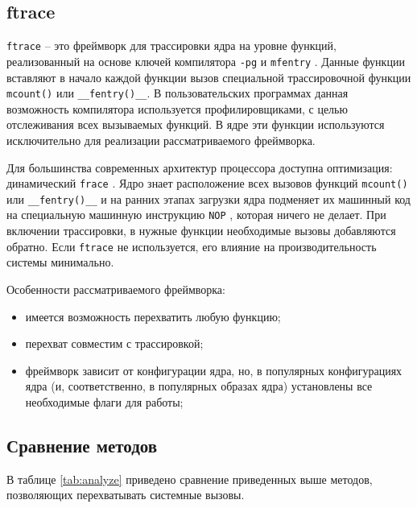 \subsection{ftrace}

\texttt{ftrace} \cite{ftrace} -- это фреймворк для трассировки ядра на уровне функций, реализованный на основе ключей компилятора \texttt{-pg} \cite{ftrace-habr} и \texttt{mfentry} \cite{ftrace-habr}. Данные функции вставляют в начало каждой функции вызов специальной трассировочной функции \texttt{mcount()} или \texttt{\_\_fentry()\_\_}. В пользовательских программах данная возможность компилятора используется профилировщиками, с целью отслеживания всех вызываемых функций. В ядре эти функции используются исключительно для реализации рассматриваемого фреймворка.

Для большинства современных архитектур процессора доступна оптимизация: динамический \texttt{frace} \cite{ftrace-habr}. Ядро знает расположение всех вызовов функций \texttt{mcount()} или \texttt{\_\_fentry()\_\_} и на ранних этапах загрузки ядра подменяет их машинный код на специальную машинную инструкцию \texttt{NOP} \cite{NOP}, которая ничего не делает. При включении трассировки, в нужные функции необходимые вызовы добавляются обратно. Если \texttt{ftrace} не используется, его влияние на производительность системы минимально.

Особенности рассматриваемого фреймворка:

\begin{itemize}
	\item имеется возможность перехватить любую функцию;
	\item перехват совместим с трассировкой;
	\item фреймворк зависит от конфигурации ядра, но, в популярных конфигурациях ядра (и, соответственно, в популярных образах ядра) установлены все необходимые флаги для работы; 
\end{itemize}

\subsection*{Сравнение методов}

В таблице \ref{tab:analyze} приведено сравнение приведенных выше методов, позволяющих перехватывать системные вызовы.

